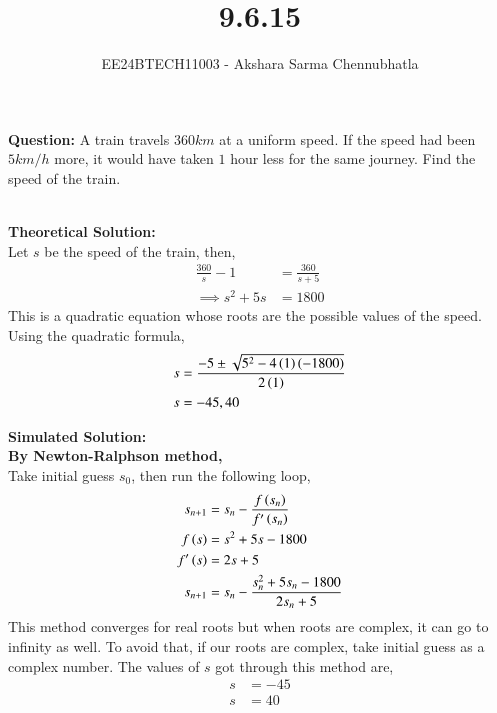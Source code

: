 \documentclass[journal, article]{IEEEtran}
\begin{document}

\vspace{3cm}

\title{9.6.15}
\author{EE24BTECH11003 - Akshara Sarma Chennubhatla}
{\let\newpage\relax\maketitle}
\textbf{Question:}
A train travels $360km$ at a uniform speed. If the speed had been $5km/h$ more, it would have taken $1$ hour less for the same journey. Find the speed of the train.

\solution\\
\textbf{Theoretical Solution:}\\

Let $s$ be the speed of the train, then,
\begin{align}
	\frac{360}{s} - 1 &= \frac{360}{s + 5}\\
	\implies s^2 + 5s &= 1800
\end{align}
This is a quadratic equation whose roots are the possible values of the speed.\\
Using the quadratic formula,
\begin{align}
	s &= \frac{-5 \pm \sqrt{5^2 - 4\left(1\right)\left(-1800\right)}}{2\left(1\right)}\\
	s &= -45, 40
\end{align}

\textbf{Simulated Solution:}\\

\textbf{By Newton-Ralphson method,}\\
Take initial guess $s_0$, then run the following loop,
\begin{align}
	s_{n+1} &= s_n - \frac{f\left(s_n\right)}{f^\prime\left(s_n\right)}\\
	f\left(s\right) &= s^2 + 5s - 1800\\
	f^\prime\left(s\right) &= 2s + 5\\
	s_{n+1} &= s_n - \frac{s_n^2 + 5s_n - 1800}{2s_n + 5}
\end{align}
This method converges for real roots but when roots are complex, it can go to infinity as well. To avoid that, if our roots are complex, take initial guess as a complex number.
The values of $s$ got through this method are,
\begin{align}
	s &= -45\\
	s &= 40
\end{align}
\end{document}
